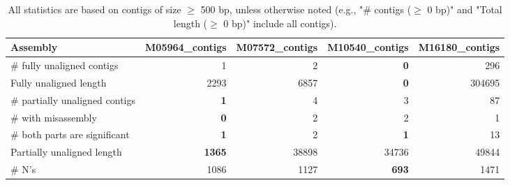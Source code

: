 \documentclass[12pt,a4paper]{article}
\begin{document}
\begin{table}[ht]
\begin{center}
\caption{All statistics are based on contigs of size $\geq$ 500 bp, unless otherwise noted (e.g., "\# contigs ($\geq$ 0 bp)" and "Total length ($\geq$ 0 bp)" include all contigs).}
\begin{tabular}{|l*{4}{|r}|}
\hline
Assembly & M05964\_contigs & M07572\_contigs & M10540\_contigs & M16180\_contigs \\ \hline
\# fully unaligned contigs & 1 & 2 & {\bf 0} & 296 \\ \hline
Fully unaligned length & 2293 & 6857 & {\bf 0} & 304695 \\ \hline
\# partially unaligned contigs & {\bf 1} & 4 & 3 & 87 \\ \hline
\hspace{5mm}\# with misassembly & {\bf 0} & 2 & 2 & 1 \\ \hline
\hspace{5mm}\# both parts are significant & {\bf 1} & 2 & {\bf 1} & 13 \\ \hline
Partially unaligned length & {\bf 1365} & 38898 & 34736 & 49844 \\ \hline
\# N's & 1086 & 1127 & {\bf 693} & 1471 \\ \hline
\end{tabular}
\end{center}
\end{table}
\end{document}

